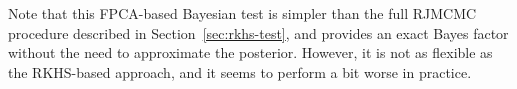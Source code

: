 Note that this \acs{FPCA}-based Bayesian test is simpler than the full \acs{RJMCMC} procedure described in Section~\ref{sec:rkhs-test}, and provides an exact Bayes factor without the need to approximate the posterior. However, it is not as flexible as the \acs{RKHS}-based approach, and it seems to perform a bit worse in practice.

